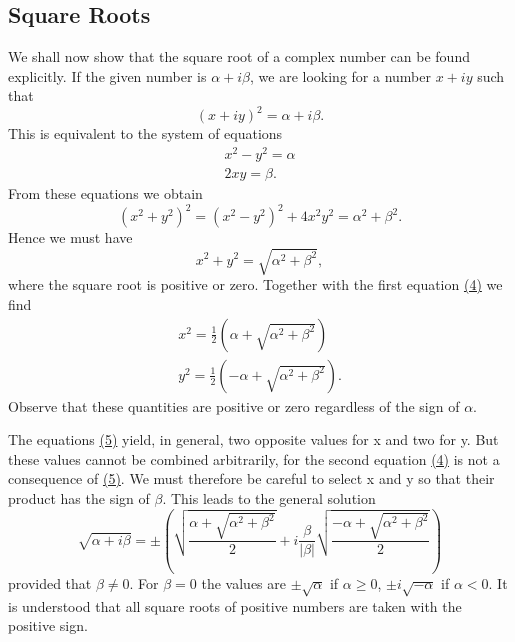 \setcounter{section}{1}\setcounter{subsection}{1}\subsection{Square Roots}\label{sec:1.1.2}
We shall now show that the square root of a complex number can be found explicitly. If the given number is $\alpha + i\beta$, we are looking for a number $x + iy$ such that
\begin{equation*}
(x + i y) ^ {2} = \alpha + i \beta .
\end{equation*}
This is equivalent to the system of equations
\begin{equation*}
\begin{array}{r} x ^ {2} - y ^ {2} = \alpha \\ 2 x y = \beta . \end{array}\tag{4}\label{eq:1.4}
\end{equation*}
From these equations we obtain
\begin{equation*}
(x ^ {2} + y ^ {2}) ^ {2} = (x ^ {2} - y ^ {2}) ^ {2} + 4 x ^ {2} y ^ {2} = \alpha^ {2} + \beta^ {2}.
\end{equation*}
Hence we must have
\begin{equation*}
x ^ {2} + y ^ {2} = \sqrt {\alpha^ {2} + \beta^ {2}},
\end{equation*}
where the square root is positive or zero. Together with the first equation \hyperref[eq:1.4]{(4)} we find
\begin{equation*}
\begin{array}{l} x ^ {2} = \frac {1}{2} (\alpha + \sqrt {\alpha^ {2} + \beta^ {2}}) \\ y ^ {2} = \frac {1}{2} (- \alpha + \sqrt {\alpha^ {2} + \beta^ {2}}). \end{array}\tag{5}\label{eq:1.5}
\end{equation*}
Observe that these quantities are positive or zero regardless of the sign of $\alpha$.

The equations \hyperref[eq:1.5]{(5)} yield, in general, two opposite values for x and two for y. But these values cannot be combined arbitrarily, for the second equation \hyperref[eq:1.4]{(4)} is not a consequence of \hyperref[eq:1.5]{(5)}. We must therefore be careful to select x and y so that their product has the sign of $\beta$. This leads to the general solution
\begin{equation*}
\sqrt {\alpha + i \beta} = \pm \left(\sqrt {\frac {\alpha + \sqrt {\alpha^ {2} + \beta^ {2}}}{2}} + i \frac {\beta}{| \beta |} \sqrt {\frac {- \alpha + \sqrt {\alpha^ {2} + \beta^ {2}}}{2}}\right)\tag{6}\label{eq:1.6}
\end{equation*}
provided that $\beta \neq 0$. For $\beta = 0$ the values are $\pm \sqrt{\alpha}$ if $\alpha \geq 0$, $\pm i\sqrt{-\alpha}$
if $\alpha < 0$. It is understood that all square roots of positive numbers are taken with the positive sign.


